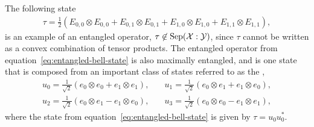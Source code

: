 The following state
\begin{align} \label{eq:entangled-bell-state}
\tau = \frac{1}{2} \left(E_{0,0} \otimes E_{0,0} + E_{0,1} \otimes E_{0,1} + E_{1,0} \otimes E_{1,0} + E_{1,1} \otimes E_{1,1} \right),
\end{align}
is an example of an entangled operator, $\tau \not \in \mathrm{Sep}(\mathcal{X} : \mathcal{Y})$, since $\tau$ cannot be written as a convex combination of tensor products. The entangled operator from equation~\eqref{eq:entangled-bell-state} is also maximally entangled, and is one state that is composed from an important class of states referred to as the ,
\begin{equation} \label{eq:Bell-states-vecs}
	\begin{aligned}
		u_{0} = \frac{1}{\sqrt{2}} \left( e_0 \otimes e_0 + e_1 \otimes e_1 \right), &\quad u_{1} = \frac{1}{\sqrt{2}} \left( e_0 \otimes e_1 + e_1 \otimes e_0 \right), \\
		u_{2} = \frac{1}{\sqrt{2}} \left( e_0 \otimes e_1 - e_1 \otimes e_0 \right), &\quad u_{3} = \frac{1}{\sqrt{2}} \left( e_0 \otimes e_0 - e_1 \otimes e_1 \right),
	\end{aligned}
\end{equation}
where the state from equation~\eqref{eq:entangled-bell-state} is given by $\tau = u_{0} u_{0}^*$. 

